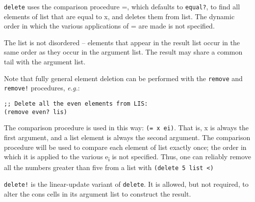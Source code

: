 \begin{entry}{%
  }

  \texttt{delete} uses the comparison
  procedure =, which defaults to \texttt{equal?}, to find all elements
  of list that are equal to x, and deletes them from list. The dynamic
  order in which the various applications of = are made is not
  specified.

  The list is not disordered -- elements that appear in the result
  list occur in the same order as they occur in the argument list. The
  result may share a common tail with the argument list.

  Note that fully general element deletion can be performed with the
  \texttt{remove} and \texttt{remove!} procedures, \emph{e.g.}:

\begin{verbatim}
;; Delete all the even elements from LIS:
(remove even? lis)
\end{verbatim}

  The comparison procedure is used in this way: \texttt{(=\ x\
    ei)}. That is, x is always the first argument, and a list element
  is always the second argument. The comparison procedure will be used
  to compare each element of list exactly once; the order in which it
  is applied to the various e\textsubscript{i} is not specified. Thus,
  one can reliably remove all the numbers greater than five from a
  list with \texttt{(delete\ 5\ list\ \textless{})}

  \texttt{delete!} is the linear-update variant of \texttt{delete}. It
  is allowed, but not required, to alter the cons cells in its
  argument list to construct the result.
\end{entry}

